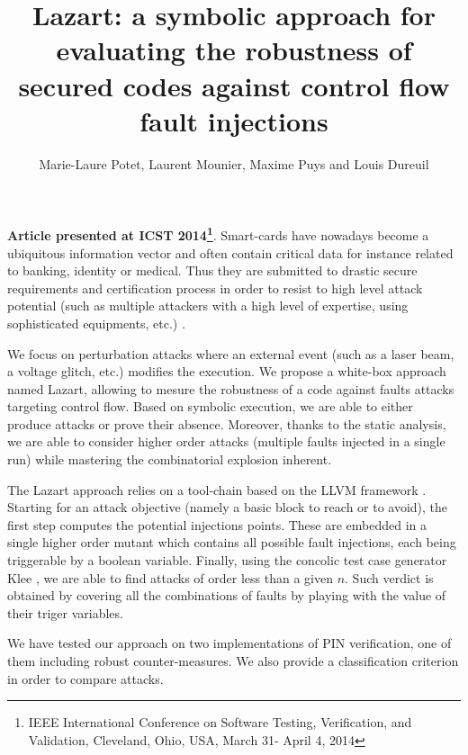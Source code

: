 \documentclass[10pt, article]{llncs}
\title{Lazart: a symbolic approach for evaluating the robustness of secured codes against  control flow fault injections}
\author{Marie-Laure Potet, Laurent Mounier, Maxime Puys and Louis Dureuil}
\institute{Verimag, University of Grenoble Alpes \\ firstname.name@imag.fr}
\begin{document}
\maketitle

{\bf Article presented at ICST 2014\footnote{IEEE International Conference on Software Testing, Verification, and Validation, Cleveland, Ohio, USA, March 31- April 4, 2014}}.
Smart-cards have nowadays become a ubiquitous information vector and often contain critical data for instance related to banking, identity or medical. Thus they are submitted to drastic secure requirements and certification process in order to resist to high level attack potential (such as multiple attackers with a high level of expertise, using sophisticated equipments, etc.) \cite{CCDB-2009-03-001}.

We focus on perturbation attacks where an external event (such as a laser beam, a voltage glitch, etc.) modifies the execution. We propose a white-box approach named Lazart, allowing to mesure the robustness of a code against faults attacks targeting control flow. Based on symbolic execution, we are able to either produce attacks or prove their absence. Moreover, thanks to the static analysis, we are able to consider higher order attacks (multiple faults injected in a single run) while mastering the combinatorial explosion inherent.

The Lazart approach relies on a tool-chain based on the LLVM framework \cite{LLVM:CGO04}. Starting for an attack objective (namely a basic block to reach or to avoid), the first step computes the potential injections points. These are embedded in a single higher order mutant which contains all possible fault injections, each being triggerable by a boolean variable.
Finally, using the concolic test case generator Klee \cite{CadarDE08}, we are able to find attacks of order less than a given $n$. Such verdict is obtained by covering all the combinations of faults by playing with the value of their triger variables.

We have tested our approach on two implementations of PIN verification, one of them including robust counter-measures. We also provide a classification criterion in order to compare attacks.



\end{document}
